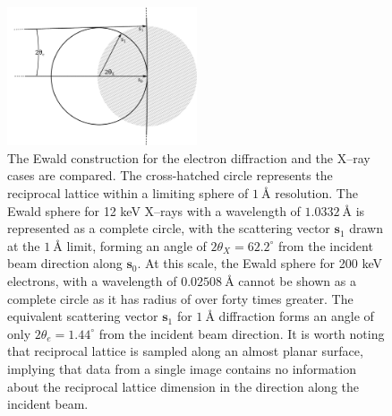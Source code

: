 \documentclass[preprint]{iucr}
\renewcommand{\vec}[1]{\mathbf{#1}}
\begin{document}
\begin{figure}
  \label{fig:ewald}
  \centering
  \caption{
    The Ewald construction for the electron diffraction and the X--ray cases are
    compared. The cross-hatched circle represents the reciprocal lattice within
    a limiting sphere of $\SI{1}{\angstrom}$ resolution. The Ewald
    sphere for 12 keV X--rays with a wavelength of $\SI{1.0332}{\angstrom}$ is
    represented as a complete circle, with the scattering vector $\vec{s}_1$
    drawn at the $\SI{1}{\angstrom}$ limit, forming an angle of
    $2\theta_X=62.2^\circ$ from the incident beam direction along $\vec{s}_0$.
    At this scale, the Ewald sphere for 200 keV electrons, with a wavelength of
    $\SI{0.02508}{\angstrom}$ cannot be shown as a complete circle as it has
    radius of over forty times greater. The equivalent scattering vector
    $\vec{s}_1$ for $\SI{1}{\angstrom}$ diffraction forms an angle of only
    $2\theta_e=1.44^\circ$ from the incident beam direction. It is worth noting
    that reciprocal lattice is sampled along an almost planar surface,
    implying that data from a single image contains no information about the
    reciprocal lattice dimension in the direction along the incident beam.
  }
  \includegraphics[width=0.5\textwidth]{Figures/geometry/ewald.png}
\end{figure}
\end{document}

